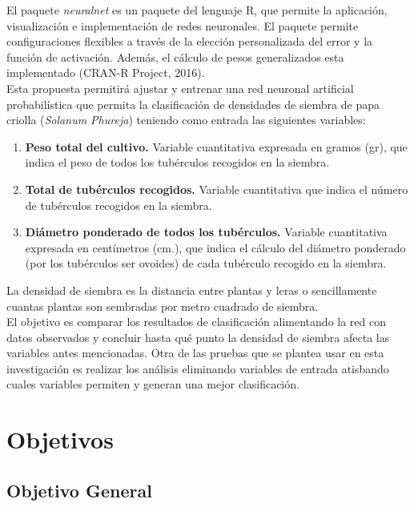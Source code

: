El paquete \textit{neuralnet} es un paquete del lenguaje R,  que permite la aplicación, visualización e implementación de redes neuronales. El paquete permite configuraciones flexibles a través de la elección personalizada del error y la función de activación. Además, el cálculo de pesos generalizados esta implementado (CRAN-R Project, 2016).\\

Esta propuesta permitirá ajustar y entrenar una red neuronal artificial probabilística que permita la clasificación de densidades de siembra de papa criolla (\textit{Solanum Phureja}) teniendo como entrada las siguientes variables: 

\begin{enumerate}
    \item{\textbf{Peso total del cultivo.} Variable cuantitativa expresada en gramos (gr), que indica el peso de todos los tubérculos recogidos en la siembra.}
	\item{\textbf{Total de tubérculos recogidos.} Variable cuantitativa que indica el número de tubérculos recogidos en la siembra.}
	\item{\textbf{Diámetro ponderado de todos los tubérculos.} Variable cuantitativa expresada en centímetros (cm.), que indica el cálculo del diámetro ponderado (por los tubérculos ser ovoides) de cada tubérculo recogido en la siembra.}
\end{enumerate}

La densidad de siembra es la distancia entre plantas y leras o sencillamente cuantas plantas son sembradas por metro cuadrado de siembra.\\

El objetivo es comparar los resultados de clasificación alimentando la red con datos observados y concluir hasta qué punto la densidad de siembra afecta las variables antes mencionadas. Otra de las pruebas que se plantea usar en esta investigación es realizar los análisis eliminando variables de entrada atisbando cuales variables permiten y generan una mejor clasificación.\\

\section{Objetivos}

\subsection{Objetivo General}


